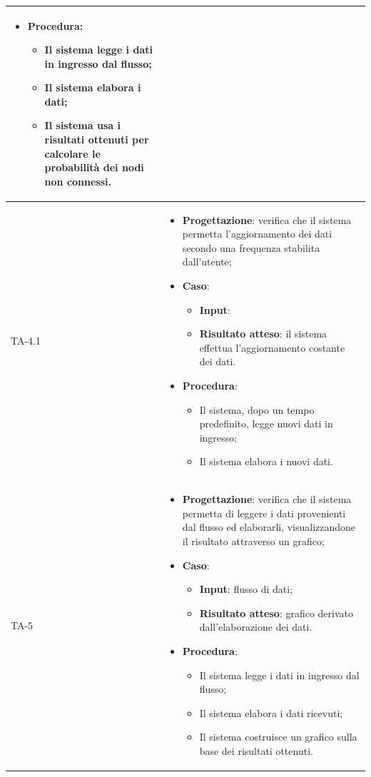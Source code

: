 \begin{longtable}{|C{2.5cm}|C{13cm}|}
\begin{itemize}
\begin{itemize}
	\end{itemize}
	\item \textbf{Procedura}:
	\begin{itemize}
		\item Il sistema legge i dati in ingresso dal flusso;
		\item Il sistema elabora i dati;
		\item Il sistema usa i risultati ottenuti per calcolare le probabilità dei nodi non connessi.
	\end{itemize} 
\end{itemize}\\
\hline
{TA-4.1} &
\begin{itemize}
	\item \textbf{Progettazione}: verifica che il sistema permetta l'aggiornamento dei dati secondo una frequenza stabilita dall'utente;
	\item \textbf{Caso}: 
	\begin{itemize}
		\item \textbf{Input}:
		\item \textbf{Risultato atteso}: il sistema effettua l'aggiornamento costante dei dati.
	\end{itemize}
	\item \textbf{Procedura}:
	\begin{itemize}
		\item Il sistema, dopo un tempo predefinito, legge nuovi dati in ingresso;
		\item Il sistema elabora i nuovi dati.
	\end{itemize} 
\end{itemize} \\
\hline
{TA-5} &
\begin{itemize}
	\item \textbf{Progettazione}: verifica che il sistema permetta di leggere i dati provenienti dal flusso ed elaborarli, visualizzandone il risultato attraverso un grafico;
	\item \textbf{Caso}: 
	\begin{itemize}
		\item \textbf{Input}: flusso di dati;
		\item \textbf{Risultato atteso}: grafico derivato dall'elaborazione dei dati.
	\end{itemize}
	\item \textbf{Procedura}:
	\begin{itemize}
		\item Il sistema legge i dati in ingresso dal flusso;
		\item Il sistema elabora i dati ricevuti;
		\item Il sistema costruisce un grafico sulla base dei risultati ottenuti.
	\end{itemize} 
\end{itemize} \\
\hline


\end{longtable}
